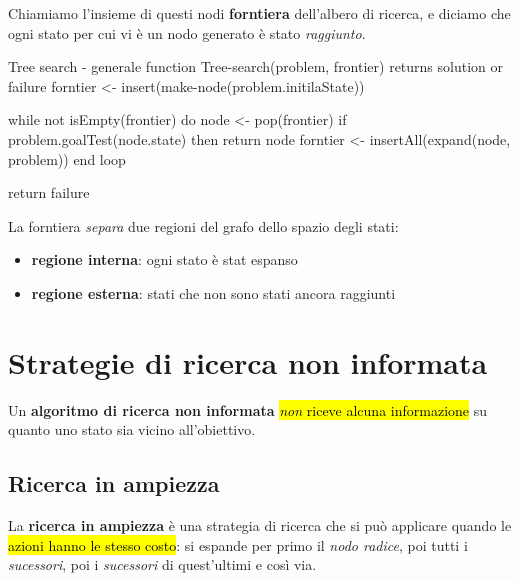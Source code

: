 \documentclass[12pt, a4paper, oneside]{book}
\begin{document}
    Chiamiamo l'insieme di questi nodi \textbf{forntiera} dell'albero di ricerca, e diciamo che ogni stato per cui vi è un nodo generato è stato \textit{raggiunto}.

    \begin{codice}[python]{Tree search - generale}
      function Tree-search(problem, frontier) returns solution or failure
        forntier <- insert(make-node(problem.initilaState))

        while not isEmpty(frontier) do
          node <- pop(frontier)
          if problem.goalTest(node.state) then return node
            forntier <- insertAll(expand(node, problem))
        end loop

        return failure
    \end{codice}

    La forntiera \textit{separa} due regioni del grafo dello spazio degli stati:
    \begin{itemize}
      \item \textbf{regione interna}: ogni stato è stat espanso
      \item \textbf{regione esterna}: stati che non sono stati ancora raggiunti
    \end{itemize}


    \section{Strategie di ricerca non informata}
    Un \textbf{algoritmo di ricerca non informata} \hl{\textit{non} riceve alcuna informazione} su quanto uno stato sia vicino all'obiettivo.


    \subsection{Ricerca in ampiezza}
    La \textbf{ricerca in ampiezza} è una strategia di ricerca che si può applicare quando le \hl{azioni hanno le stesso costo}: si espande per primo il \textit{nodo radice}, poi tutti i \textit{sucessori}, poi i \textit{sucessori} di quest'ultimi e così via.
\end{document}

